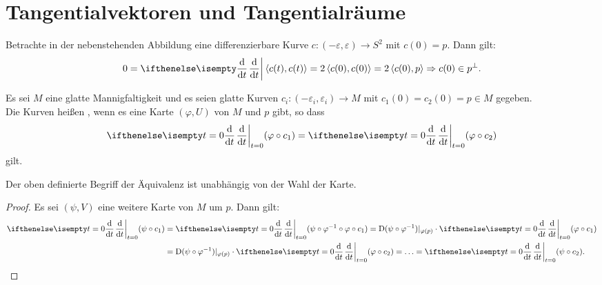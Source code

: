 
\section{Tangentialvektoren und Tangentialräume}


Betrachte in der nebenstehenden Abbildung eine differenzierbare Kurve $c \colon (-\varepsilon,\varepsilon) \to S^2$ mit $c(0) = p$. Dann gilt:
\begin{align*}
  0 = \difffrac{}{t} \left<c(t),c(t)\right> = 2\left<c(0),c(0)\right> = 2 \left<c(0),p\right> 
  \Rightarrow c(0) \in p^{\perp}.
\end{align*}


Es sei $M$ eine glatte Mannigfaltigkeit und es seien glatte Kurven $c_i\colon (-\varepsilon_i,\varepsilon_i) \to M$ mit $c_1(0) = c_2(0) = p \in M$ gegeben.\\

Die Kurven heißen , wenn es eine Karte $(\varphi,U)$ von $M$ und $p$ gibt, so dass 
\begin{align*}
  \difffrac[t=0]{}{t}(\varphi \circ c_1) = \difffrac[t=0]{}{t}(\varphi \circ c_2)
\end{align*}
gilt.

\begin{lemma}
  Der oben definierte Begriff der Äquivalenz ist unabhängig von der Wahl der Karte.
\end{lemma}

\begin{proof}
  Es sei $(\psi,V)$ eine weitere Karte von $M$ um $p$. Dann gilt:
  \begin{align*}
    \difffrac[t=0]{}{t}(\psi\circ c_1) & = \difffrac[t=0]{}{t}(\psi\circ\varphi^{-1}\circ\varphi \circ c_1) = \D (\psi \circ \varphi^{-1})|_{\varphi(p)} \cdot \difffrac[t=0]{}{t}(\varphi \circ c_1)\\
    & = \D(\psi \circ \varphi^{-1})|_{\varphi(p)} \cdot \difffrac[t=0]{}{t}(\varphi \circ c_2) = \ldots = \difffrac[t=0]{}{t}(\psi \circ c_2).
  \end{align*}
\end{proof}

